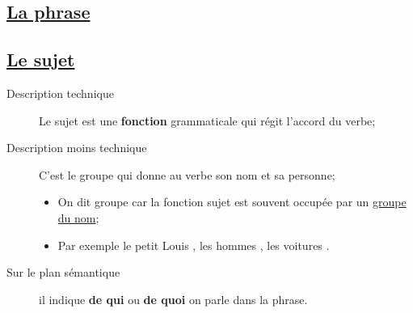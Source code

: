 \documentclass[10pt, french]{article}
\begin{document}
\begin{multicols*}{2}
\newpage
\section*{\href{http://www.alloprof.qc.ca/bv/pages/f1128.aspx}{La phrase}}

\subsection*{\href{http://www.alloprof.qc.ca/BV/Pages/f1130.aspx}{Le sujet}}
\begin{description}
	\item[Description technique]	Le sujet est une \textbf{fonction} grammaticale qui régit l'accord du verbe;
	\item[Description moins technique]	C'est le \og groupe \fg{} qui donne au verbe son nom et sa personne;
		\begin{itemize}[leftmargin = *]
		\item	On dit \og groupe \fg{} car la fonction sujet est souvent occupée par un \href{http://www.alloprof.qc.ca/BV/pages/f1235.aspx}{groupe du nom};
		\item	Par exemple \og le petit Louis \fg{}, \og les hommes \fg{}, \og les voitures \fg{}.
		\end{itemize}
	\item[Sur le plan sémantique]	il indique \textbf{de qui} ou \textbf{de quoi} on parle dans la phrase.
\end{description}


\end{multicols*}
\end{document}

